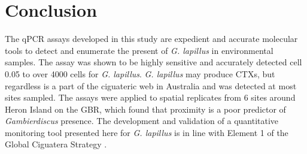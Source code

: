 \documentclass[12pt]{article}
\begin{document}
\section*{Conclusion}
The qPCR assays developed in this study are expedient and accurate molecular tools to detect and enumerate the present of \emph{G. lapillus} %
in environmental samples. 
The assay was shown to be highly sensitive and accurately detected cell 0.05 to over 4000 cells for \emph{G. lapillus}. %
\emph{G. lapillus} may produce CTXs, but regardless is a part of the ciguateric web in Australia and was detected at most sites sampled.
The assays were applied to spatial replicates from 6 sites around Heron Island on the GBR, which found that proximity is a poor predictor of \textit{Gambierdiscus} presence. 
The development and validation of a quantitative monitoring tool presented here for \textit{G. lapillus} is in line with Element 1 of the Global Ciguatera Strategy \cite{globalcig}.
\end{document}
